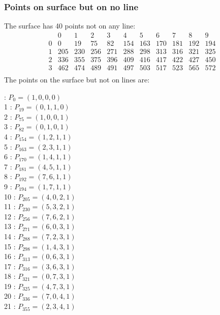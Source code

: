 \documentclass{article}
\begin{document}
{\subsubsection*{Points on surface but on no line}
The surface has 40 points not on any line:\\
$$
\begin{array}{r|*{10}{r}}
 & 0 & 1 & 2 & 3 & 4 & 5 & 6 & 7 & 8 & 9\\
\hline
0 & 0 & 19 & 75 & 82 & 154 & 163 & 170 & 181 & 192 & 194\\
1 & 205 & 230 & 256 & 271 & 288 & 298 & 313 & 316 & 321 & 325\\
2 & 336 & 355 & 375 & 396 & 409 & 416 & 417 & 422 & 427 & 450\\
3 & 462 & 474 & 489 & 491 & 497 & 503 & 517 & 523 & 565 & 572\\
\end{array}
$$
The points on the surface but not on lines are:\\
\begin{multicols}{2}
 : $P_{0}=( 1, 0, 0, 0 )$\\
1 : $P_{19}=( 0, 1, 1, 0 )$\\
2 : $P_{75}=( 1, 0, 0, 1 )$\\
3 : $P_{82}=( 0, 1, 0, 1 )$\\
4 : $P_{154}=( 1, 2, 1, 1 )$\\
5 : $P_{163}=( 2, 3, 1, 1 )$\\
6 : $P_{170}=( 1, 4, 1, 1 )$\\
7 : $P_{181}=( 4, 5, 1, 1 )$\\
8 : $P_{192}=( 7, 6, 1, 1 )$\\
9 : $P_{194}=( 1, 7, 1, 1 )$\\
10 : $P_{205}=( 4, 0, 2, 1 )$\\
11 : $P_{230}=( 5, 3, 2, 1 )$\\
12 : $P_{256}=( 7, 6, 2, 1 )$\\
13 : $P_{271}=( 6, 0, 3, 1 )$\\
14 : $P_{288}=( 7, 2, 3, 1 )$\\
15 : $P_{298}=( 1, 4, 3, 1 )$\\
16 : $P_{313}=( 0, 6, 3, 1 )$\\
17 : $P_{316}=( 3, 6, 3, 1 )$\\
18 : $P_{321}=( 0, 7, 3, 1 )$\\
19 : $P_{325}=( 4, 7, 3, 1 )$\\
20 : $P_{336}=( 7, 0, 4, 1 )$\\
21 : $P_{355}=( 2, 3, 4, 1 )$\\

\end{multicols}}
\end{document}
